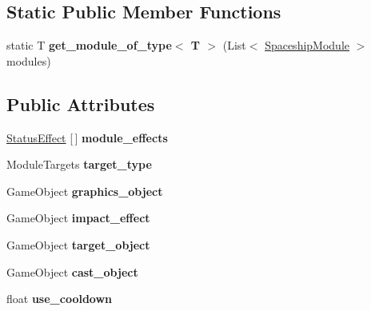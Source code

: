 \subsection*{Static Public Member Functions}
\begin{DoxyCompactItemize}
\item 
\mbox{\label{class_spaceship_module_a9babd33ad1962f515a84515e8d716026}} 
static T {\bfseries get\+\_\+module\+\_\+of\+\_\+type$<$ T $>$} (List$<$ \hyperlink{class_spaceship_module}{Spaceship\+Module} $>$ modules)
\end{DoxyCompactItemize}
\subsection*{Public Attributes}
\begin{DoxyCompactItemize}
\item 
\mbox{\label{class_spaceship_module_aefd187543df78475abf64860404fa7b9}} 
\hyperlink{class_status_effect}{Status\+Effect} \mbox{[}$\,$\mbox{]} {\bfseries module\+\_\+effects}
\item 
\mbox{\label{class_spaceship_module_ae7a6ed87ea936e35308d4e88254505f4}} 
Module\+Targets {\bfseries target\+\_\+type}
\item 
\mbox{\label{class_spaceship_module_ad2b081693b9b688ac7defa85cf456f69}} 
Game\+Object {\bfseries graphics\+\_\+object}
\item 
\mbox{\label{class_spaceship_module_ad6fe6fc9b98c89629a7d7e38f36ca492}} 
Game\+Object {\bfseries impact\+\_\+effect}
\item 
\mbox{\label{class_spaceship_module_a792486862ce07fee4e77e2911a348e6c}} 
Game\+Object {\bfseries target\+\_\+object}
\item 
\mbox{\label{class_spaceship_module_a25a1e995f4b514743d45a4b60fcef711}} 
Game\+Object {\bfseries cast\+\_\+object}
\item 
\mbox{\label{class_spaceship_module_a63d2ef58c745bf8d3481eb5e8d63b8ce}} 
float {\bfseries use\+\_\+cooldown}

\end{DoxyCompactItemize}
